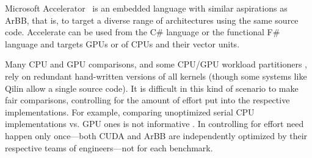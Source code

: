 Microsoft Accelerator~\cite{accelerator} is an embedded language with similar 
aspirations as ArBB, that is, to target a diverse range of architectures using the 
same source code. Accelerate can be used from the C\# language or the 
functional F\# language and targets GPUs or of CPUs and their
vector units.


Many CPU and GPU comparisons, and some CPU/GPU workload partitioners \cite{merge}, rely on
redundant hand-written versions of all kernels
(though some systems like Qilin \cite{qilin} allow a single source code).
It is difficult in this kind of scenario
to make fair comparisons, controlling for the
amount of effort put into the respective implementations.
For example, comparing unoptimized serial CPU implementations vs. GPU
ones is not informative \cite{debunking-dubey}.
In \systemname{} controlling for effort
need happen only once---both CUDA and ArBB are
independently optimized by their respective teams of engineers---not for each benchmark.




